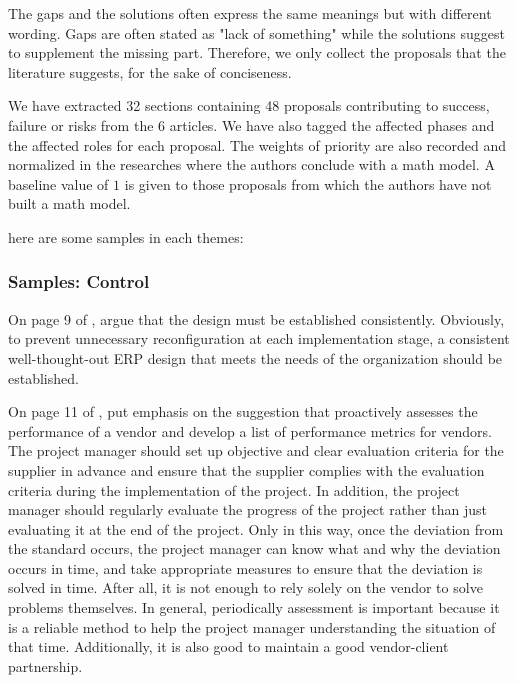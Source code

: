The gaps and the solutions often express the same meanings but with different wording. Gaps are often stated as "lack of something" while the solutions suggest to supplement the missing part. Therefore, we only collect the proposals that the literature suggests, for the sake of conciseness.

We have extracted 32 sections containing 48 proposals contributing to success, failure or risks from the 6 articles. We have also tagged the affected phases and the affected roles for each proposal. The weights of priority are also recorded and normalized in the researches where the authors conclude with a math model. A baseline value of $1$ is given to those proposals from which the authors have not built a math model.

here are some samples in each themes:

\subsubsection{Samples: Control}

On page 9 of , \citeauthor{3} argue that the design must be established consistently. Obviously, to prevent unnecessary reconfiguration at each implementation stage, a consistent well-thought-out ERP design that meets the needs of the organization should be established.

On page 11 of , \citeauthor{2} put emphasis on the suggestion that proactively assesses the performance of a vendor and develop a list of performance metrics for vendors. The project manager should set up objective and clear evaluation criteria for the supplier in advance and ensure that the supplier complies with the evaluation criteria during the implementation of the project. In addition, the project manager should regularly evaluate the progress of the project rather than just evaluating it at the end of the project. Only in this way, once the deviation from the standard occurs, the project manager can know what and why the deviation occurs in time, and take appropriate measures to ensure that the deviation is solved in time. After all, it is not enough to rely solely on the vendor to solve problems themselves. In general, periodically assessment is important because it is a reliable method to help the project manager understanding the situation of that time. Additionally, it is also good to maintain a good vendor-client partnership.

